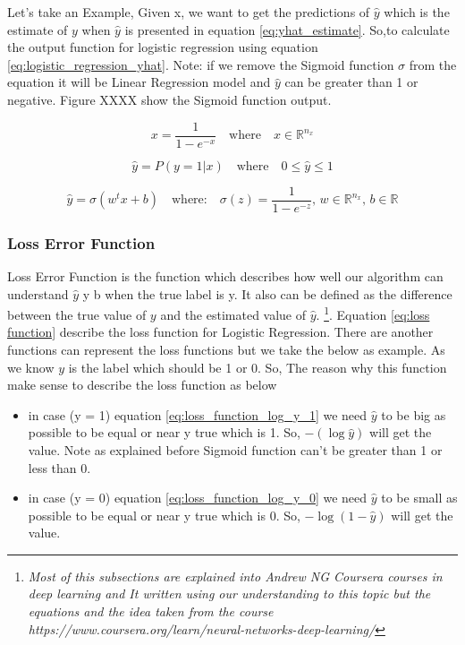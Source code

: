 Let's take an Example, Given x, we want to get the predictions of $\widehat{y}$ which is the estimate of $y$  when $\widehat{y}$  is presented in equation \eqref{eq:yhat_estimate}. So,to calculate the output function for logistic regression using equation \eqref{eq:logistic_regression_yhat}. Note: if we remove the Sigmoid function $\sigma$ from the equation it will be Linear Regression model and $\widehat{y}$ can be greater than 1 or negative. Figure XXXX show the Sigmoid function output. %

\begin{equation}\label{eq:logistic_function}
  x = \frac{1}{1-e^{-x}} \quad \text{where} \quad x \in \mathbb{R}^{n_x} 
\end{equation}

\begin{equation}
  \label{eq:yhat_estimate}
    \widehat{y} = P(y=1 | x) \quad \text{where}  \quad 0 \le \widehat{y}  \le 1
  \end{equation}

\begin{equation}
  \label{eq:logistic_regression_yhat}
  \widehat{y} = \sigma(w^t x + b)  \quad \text{where:} \quad  \sigma(z) = \frac{1}{1-e^{-z}} \text{, }  w \in  \mathbb{R}^{n_x} \text{, }  b \in  \mathbb{R}  
\end{equation}


\subsubsection{Loss Error Function}

Loss Error Function is the function which describes how well our algorithm can understand  $\widehat{y}$ y b when the true label is y. It also can be defined as the difference between the true value of $y$ and the estimated value of  $\widehat{y}$. \footnote{\textit{Most of this subsections are explained into Andrew NG Coursera courses in deep learning and It written using our understanding to this topic but the equations and the idea taken from the course  https://www.coursera.org/learn/neural-networks-deep-learning/}}. Equation \eqref  {eq:loss function} describe the loss function for Logistic Regression. There are another functions can represent the loss functions but we take the below as example. As we know $y$ is the label which should be 1 or 0. So, The reason why this function make sense to describe the loss function as below
\begin{itemize}
\item in case (y = 1) equation \eqref{eq:loss_function_log_y_1} we need $\widehat{y}$ to be big as possible to be equal or near y true which is 1. So, $ - (\log \widehat{y} )$ will get the value. Note as explained before Sigmoid function can't be greater than 1 or less than 0. %
\item in case (y = 0) equation \eqref{eq:loss_function_log_y_0} we need $\widehat{y}$ to be small as possible to be equal or near y true which is 0. So, $- \log (1-\widehat{y})$  will get the value.  %
  \end{itemize}
  
